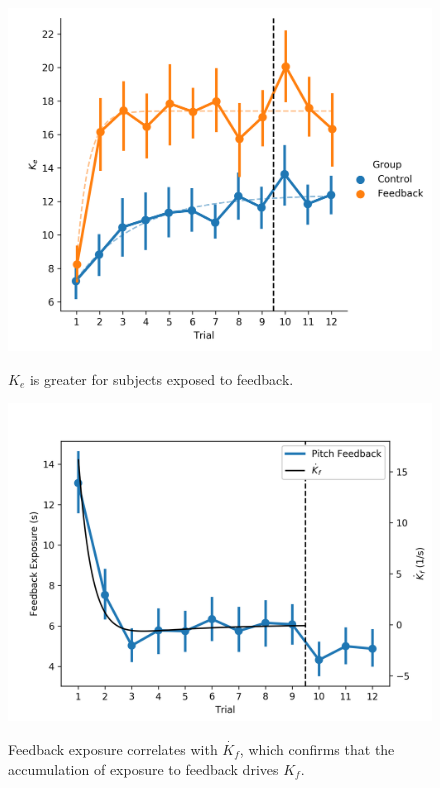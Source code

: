 \begin{figure}[t]
    \centering
    \centering
    \includegraphics[width=0.8\linewidth]{figures/Modeling/ke_group.png}
    \label{fig:ke_group}
    \caption[$K_e$ is greater for subjects exposed to feedback]{$K_e$ is greater for subjects exposed to feedback.}
\end{figure}

\begin{figure}[t]
    \centering
    \centering
    \includegraphics[width=0.8\linewidth]{figures/Modeling/f_v_kfd.png}
    \label{fig:feedback_kfd}
    \caption[Feedback exposure correlates with $\dot{K_f}$]{Feedback exposure correlates with $\dot{K_f}$, which confirms that the accumulation of exposure to feedback drives $K_f$.}
\end{figure}




